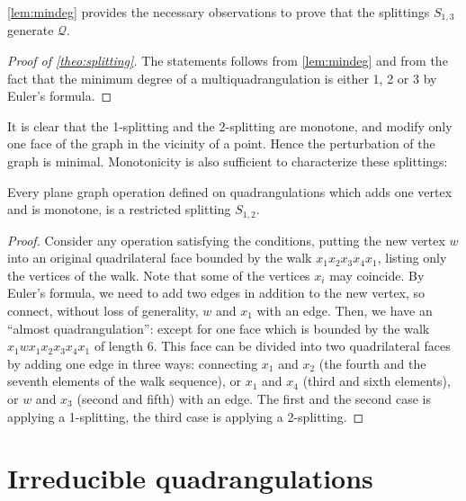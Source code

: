 \documentclass[]{article}
\begin{document}
\autoref{lem:mindeg} provides the necessary observations to prove that the splittings $S_{1,3}$ generate $\mathscr{Q}$.

\begin{proof}[Proof of \autoref*{theo:splitting}]
The statements follows from \autoref{lem:mindeg} and from the fact that the minimum degree of a multiquadrangulation is either 1, 2 or 3 by Euler's formula.
\end{proof}

It is clear that the 1-splitting and the 2-splitting are monotone, and modify only one face of the graph in the vicinity of a point.
Hence the perturbation of the graph is minimal.
Monotonicity is also sufficient to characterize these splittings:

\begin{prop}
  \label{prop:monotone}
  Every plane graph operation defined on quadrangulations which adds one vertex and is monotone, is a restricted splitting $S_{1,2}$.
\end{prop}

\begin{proof}
  Consider any operation satisfying the conditions, putting the new vertex $w$ into an original quadrilateral face bounded by the walk $x_1x_2x_3x_4x_1$, listing only the vertices of the walk.
  Note that some of the vertices $x_i$ may coincide.
  By Euler's formula, we need to add two edges in addition to the new vertex, so connect, without loss of generality, $w$ and $x_1$ with an edge.
  Then, we have an ``almost quadrangulation'': except for one face which is bounded by the walk $x_1wx_1x_2x_3x_4x_1$ of length 6.
  This face can be divided into two quadrilateral faces by adding one edge in three ways: connecting $x_1$ and $x_2$ (the fourth and the seventh elements of the walk sequence), or $x_1$ and $x_4$ (third and sixth elements), or $w$ and $x_3$ (second and fifth) with an edge.
  The first and the second case is applying a 1-splitting, the third case is applying a 2-splitting.
\end{proof}


\section{Irreducible quadrangulations}
\label{sec:irreducible}
\end{document}
